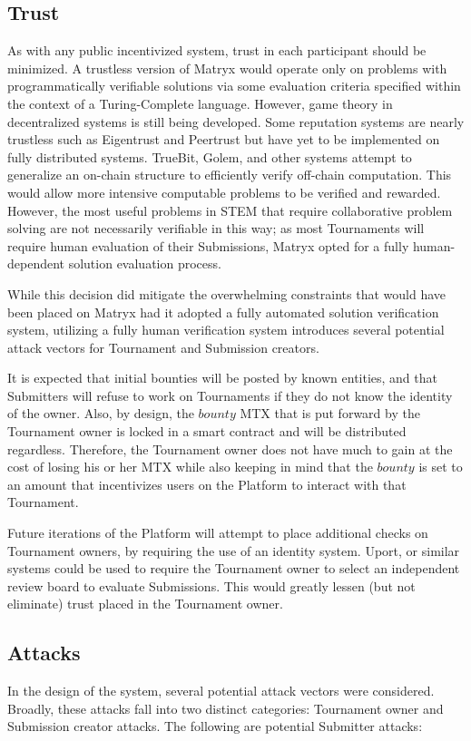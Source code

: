 \documentclass[a4paper, 10pt, conference]{ieeeconf}      %
\begin{document}
\subsection{Trust}\label{trust}
As with any public incentivized system, trust in each participant should be minimized. 
A trustless version of Matryx would operate only on problems with programmatically verifiable solutions via some evaluation criteria specified within the context of a Turing-Complete language.
However, game theory in decentralized systems is still being developed. 
Some reputation systems are nearly trustless such as Eigentrust and Peertrust but have yet to be implemented on fully distributed systems.
TrueBit\cite{teutsch}, Golem\cite{golem}, and other systems attempt to generalize an on-chain structure to efficiently verify off-chain computation\cite{sanjay2016}. 
This would allow more intensive computable problems to be verified and rewarded. 
However, the most useful problems in STEM that require collaborative problem solving are not necessarily verifiable in this way; as most Tournaments will require human evaluation of their Submissions, Matryx opted for a fully human-dependent solution evaluation process.

While this decision did mitigate the overwhelming constraints that would have been placed on Matryx had it adopted a fully automated solution verification system, utilizing a fully human verification system introduces several potential attack vectors for Tournament and Submission creators.

It is expected that initial bounties will be posted by known entities, and that Submitters will refuse to work on Tournaments if they do not know the identity of the owner.
Also, by design, the $bounty$ MTX that is put forward by the Tournament owner is locked in a smart contract and will be distributed regardless.
Therefore, the Tournament owner does not have much to gain at the cost of losing his or her MTX while also keeping in mind that the $bounty$ is set to an amount that incentivizes users on the Platform to interact with that Tournament.

Future iterations of the Platform will attempt to place additional checks on Tournament owners, by requiring the use of an identity system. 
Uport\cite{heck2016}, or similar systems could be used to require the Tournament owner to select an independent review board to evaluate Submissions. 
This would greatly lessen (but not eliminate) trust placed in the Tournament owner. 

\subsection{Attacks}\label{attacks}
In the design of the system, several potential attack vectors were considered. Broadly, these attacks fall into two distinct categories:  Tournament owner and Submission creator attacks. The following are potential Submitter attacks:
\end{document}
